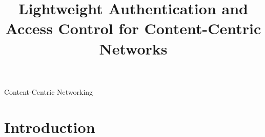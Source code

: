 \documentclass[conference]{IEEEtran}
\begin{document}
\title{Lightweight Authentication and Access Control for Content-Centric Networks} 

\author{
}

\maketitle

\begin{abstract}



\end{abstract}

\begin{IEEEkeywords}
Content-Centric Networking
\end{IEEEkeywords}

\IEEEpeerreviewmaketitle

\section{Introduction}

\nocite{adams1995hitchhiker}
\end{document}
